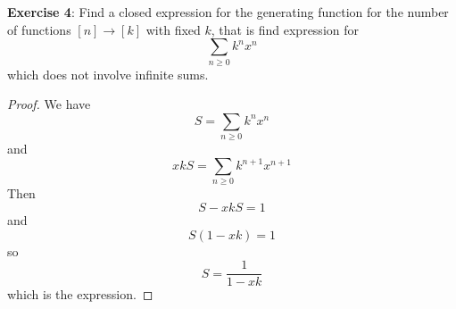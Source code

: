 \documentclass{article}
\begin{document}
\textbf{Exercise 4}: Find a closed expression for the generating function for the number of functions $[n] \rightarrow [k]$ with fixed $k$, that is find expression for 
    \begin{equation*}
        \sum_{n \geq 0}k^{n}x^{n}
    \end{equation*}
which does not involve infinite sums.

    \begin{proof}
        We have 
            \begin{equation*}
                S = \sum_{n \geq 0}k^{n}x^{n}
            \end{equation*}
        and
            \begin{equation*}
                xkS = \sum_{n \geq 0}k^{n + 1}x^{n + 1}
            \end{equation*}
        Then
            \begin{equation*}
                S - xkS = 1
            \end{equation*}
        and
            \begin{equation*}
                S(1 - xk) = 1
            \end{equation*}
        so
            \begin{equation*}
                S = \dfrac{1}{1 - xk}
            \end{equation*}
        which is the expression.
    \end{proof}
\end{document}
